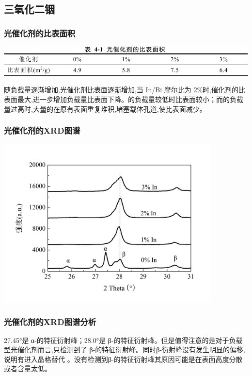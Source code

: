 \documentclass[xetex,compress]{mybeamer}
\begin{document}
\subsection{三氧化二铟}
\begin{frame}
\frametitle{光催化剂的比表面积}
\centering
\includegraphics[width=\textwidth]{figures/三氧化二铟比表面积.pdf} 
\begin{block}{}
随负载量逐渐增加,光催化剂比表面逐渐增加,当 In/Bi 摩尔比为 2\%时,催化剂的比表面最大,进一步增加负载量比表面下降。的负载量较低时比表面较小；而的负载量过高时,大量的在原有表面重复堆积,堵塞载体孔道,使比表面减少。
\end{block}
\end{frame}

\begin{frame}
\frametitle{光催化剂的XRD图谱}
\begin{block}{}
\centering
\includegraphics[width=0.85\textwidth]{figures/三氧化二铟XRD} 
\end{block}
\end{frame}

\begin{frame}
\frametitle{光催化剂的XRD图谱分析}
\begin{block}{}
27.45°是 α-的特征衍射峰；28.0°是 β-的特征衍射峰。但是值得注意的是对于负载型光催化剂而言,只检测到了 β-的特征衍射峰。同时β-衍射峰没有发生明显的偏移,说明有进入晶格替代 。没有检测到β-的特征衍射峰其原因可能是在表面高度分散或者含量太低。
\end{block}
\end{frame}
\end{document}
